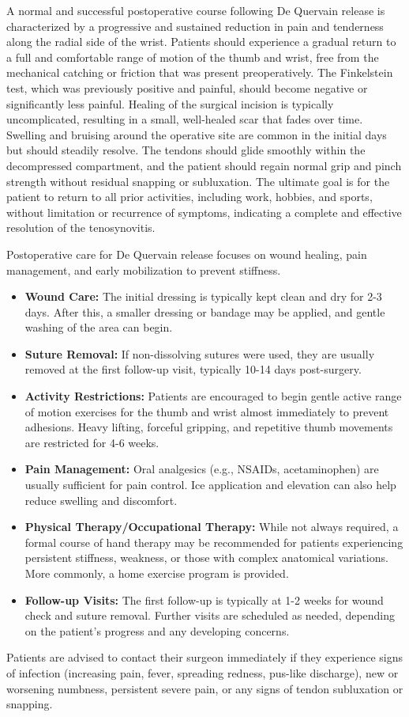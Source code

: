 A normal and successful postoperative course following De Quervain release is characterized by a progressive and sustained reduction in pain and tenderness along the radial side of the wrist. Patients should experience a gradual return to a full and comfortable range of motion of the thumb and wrist, free from the mechanical catching or friction that was present preoperatively. The Finkelstein test, which was previously positive and painful, should become negative or significantly less painful. Healing of the surgical incision is typically uncomplicated, resulting in a small, well-healed scar that fades over time. Swelling and bruising around the operative site are common in the initial days but should steadily resolve. The tendons should glide smoothly within the decompressed compartment, and the patient should regain normal grip and pinch strength without residual snapping or subluxation. The ultimate goal is for the patient to return to all prior activities, including work, hobbies, and sports, without limitation or recurrence of symptoms, indicating a complete and effective resolution of the tenosynovitis.

Postoperative care for De Quervain release focuses on wound healing, pain management, and early mobilization to prevent stiffness.

\begin{itemize}
  \item \textbf{Wound Care:} The initial dressing is typically kept clean and dry for 2-3 days. After this, a smaller dressing or bandage may be applied, and gentle washing of the area can begin.
  \item \textbf{Suture Removal:} If non-dissolving sutures were used, they are usually removed at the first follow-up visit, typically 10-14 days post-surgery.
  \item \textbf{Activity Restrictions:} Patients are encouraged to begin gentle active range of motion exercises for the thumb and wrist almost immediately to prevent adhesions. Heavy lifting, forceful gripping, and repetitive thumb movements are restricted for 4-6 weeks.
  \item \textbf{Pain Management:} Oral analgesics (e.g., NSAIDs, acetaminophen) are usually sufficient for pain control. Ice application and elevation can also help reduce swelling and discomfort.
  \item \textbf{Physical Therapy/Occupational Therapy:} While not always required, a formal course of hand therapy may be recommended for patients experiencing persistent stiffness, weakness, or those with complex anatomical variations. More commonly, a home exercise program is provided.
  \item \textbf{Follow-up Visits:} The first follow-up is typically at 1-2 weeks for wound check and suture removal. Further visits are scheduled as needed, depending on the patient's progress and any developing concerns.
\end{itemize}
Patients are advised to contact their surgeon immediately if they experience signs of infection (increasing pain, fever, spreading redness, pus-like discharge), new or worsening numbness, persistent severe pain, or any signs of tendon subluxation or snapping.

